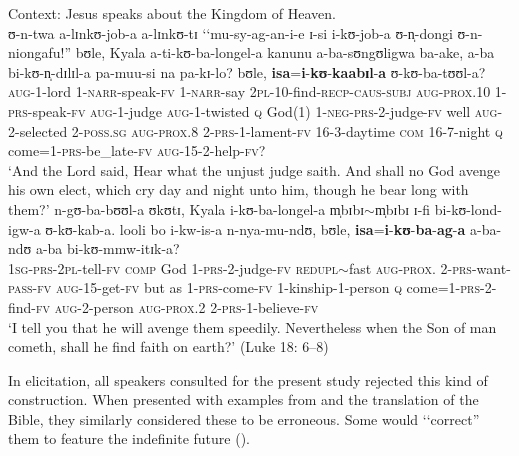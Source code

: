 \begin{exe}
\ex \label{exProcliticIsa2}
Context: Jesus speaks about the Kingdom of Heaven.\\
\gll ʊ-n-twa a-lɪnkʊ-job-a a-lɪnkʊ-tɪ \lq\lq mu-sy-ag-an-i-e ɪ-si i-kʊ-job-a ʊ-n̩-dongi ʊ-n-niongafu!'' bʊle, Kyala a-ti-kʊ-ba-longel-a kanunu a-ba-sʊngʊligwa ba-ake, a-ba bi-kʊ-n̩-dɪlɪl-a pa-muu-si na pa-kɪ-lo? bʊle, \textbf{isa}=\textbf{i}-\textbf{kʊ}-\textbf{kaabɪl}-\textbf{a} ʊ-kʊ-ba-tʊʊl-a?\\
\textsc{aug}-1-lord 1-\textsc{narr}-speak-\textsc{fv} 1-\textsc{narr}-say \phantom{\lq\lq}\textsc{2pl}-10-find-\textsc{recp}-\textsc{caus}-\textsc{subj} \textsc{aug}-\textsc{prox.10} 1-\textsc{prs}-speak-\textsc{fv} \textsc{aug}-1-judge \textsc{aug}-1-twisted \textsc{q} God(1) 1-\textsc{neg}-\textsc{prs}-2-judge-\textsc{fv} well \textsc{aug}-2-selected 2-\textsc{poss.sg} \textsc{aug}-\textsc{prox.8} 2-\textsc{prs}-1-lament-\textsc{fv} 16-3-daytime \textsc{com} 16-7-night \textsc{q} come=1-\textsc{prs}-be\_late-\textsc{fv} \textsc{aug}-15-2-help-\textsc{fv}?\\
\glt \lq And the Lord said, Hear what the unjust judge saith. And shall no God avenge his own elect, which cry day and night unto him, though he bear long with them?'
\sn \gll n-gʊ-ba-bʊʊl-a ʊkʊtɪ, Kyala i-kʊ-ba-longel-a m̩bɪbɪ$\sim$m̩bɪbɪ ɪ-fi bi-kʊ-lond-igw-a ʊ-kʊ-kab-a. looli bo i-kw-is-a n-nya-mu-ndʊ, bʊle, \textbf{isa}=\textbf{i}-\textbf{kʊ}-\textbf{ba}-\textbf{ag}-\textbf{a} a-ba-ndʊ a-ba bi-kʊ-mmw-itɪk-a?\\
\textsc{1sg}-\textsc{prs}-\textsc{2pl}-tell-\textsc{fv} \textsc{comp} God 1-\textsc{prs}-2-judge-\textsc{fv} \textsc{redupl}$\sim$fast \textsc{aug}-\textsc{prox.} 2-\textsc{prs}-want-\textsc{pass}-\textsc{fv} \textsc{aug}-15-get-\textsc{fv} but as 1-\textsc{prs}-come-\textsc{fv} 1-kinship-1-person \textsc{q} come=1-\textsc{prs}-2-find-\textsc{fv} \textsc{aug}-2-person \textsc{aug}-\textsc{prox.2} 2-\textsc{prs}-1-believe-\textsc{fv}\\
\glt \lq  I tell you that he will avenge them speedily. Nevertheless when the Son of man cometh, shall he find faith on earth?' (Luke 18: 6--8)
\end{exe}

In elicitation, all speakers consulted for the present study rejected this kind of construction. When presented with examples from \citet{BergerP1933} and the translation of the Bible, they similarly considered these to be erroneous. Some would \lq\lq correct'' them to feature the indefinite future ().

